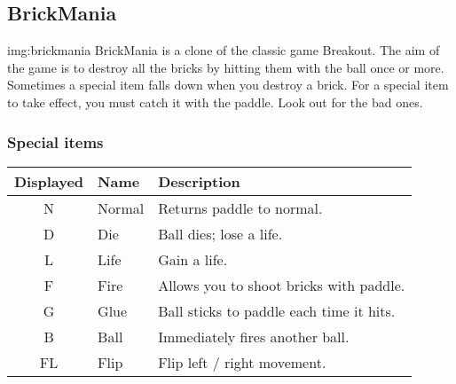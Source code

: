 \subsection{BrickMania}
%
{img:brickmania}
BrickMania is a clone of the classic game Breakout. The aim of the game is to
destroy all the bricks by hitting them with the ball once or more. Sometimes a
special item falls down when you destroy a brick. For a special item to take
effect, you must catch it with the paddle. Look out for the bad ones.\\

\subsubsection{Special items}
\begin{table}
    \begin{center}
    \begin{tabularx}{.75\textwidth}{clX}\toprule
    \textbf{Displayed} & \textbf{Name} & \textbf{Description}\\\midrule
    N & Normal & Returns paddle to normal.\\
    D & Die & Ball dies; lose a life.\\
    L & Life & Gain a life.\\
    F & Fire & Allows you to shoot bricks with paddle.\\
    G & Glue & Ball sticks to paddle each time it hits.\\
    B & Ball & Immediately fires another ball.\\
    FL & Flip & Flip left / right movement.\\\bottomrule
    \end{tabularx}
    \end{center}
\end{table}

